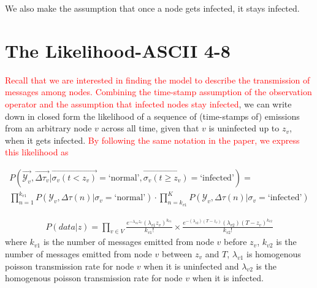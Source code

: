 \documentclass{article}
\begin{document}
	We also make the assumption that once a node gets infected, it
	stays infected.

\section{The Likelihood-ASCII 4-8}
	\textcolor{red}{Recall that we are interested in finding the model to describe
	the transmission of messages among nodes.
	Combining the time-stamp assumption of the observation operator and the assumption
	that infected nodes stay infected}, we can write down in closed form the likelihood
        of a sequence of (time-stamps of) emissions from an arbitrary node $v$ across all time, given that 
	$v$ is uninfected up to $z_{v}$, when it gets infected. \textcolor{red}{By following
	the same notation in the paper, we express this likelihood as} 
        
	\begin{eqnarray*}
		P(\vec{\mathscr{Y}_{v}}, \vec{\Delta\tau_{v}} | \vec{\sigma_{v}(t < z_{v})} = 
			\text{`normal'}, \vec{\sigma_{v}(t \geq z_{v})} = \text{`infected'})
		= \\
		\prod_{n = 1}^{k_{v1}} P(\mathscr{Y}_{v}, \Delta \tau (n) | \sigma_{v} = \text{`normal'})
			\cdot  
			\prod_{n = k_{v1}}^{K} P(\mathscr{Y}_{v}, \Delta \tau (n) | \sigma_{v} = \text{`infected'})
	\end{eqnarray*}
	
        \begin{align}
        P(data | z) = \prod_{v\in V}\frac{e^{-\lambda_{v1}z_v}(\lambda_{v1}z_v)^{k_{v1}}}{k_{v1}!}\times 
        \frac{e^{-(\lambda_{v2})(T-z_v)}(\lambda_{v2})(T-z_v)^{k_{v2}}}{k_{v2}!}
        \end{align}
        where $k_{v1}$ is the number of messages emitted from node $v$ before $z_v$, $k_{v2}$ 
        is the number of messages emitted from node $v$ between $z_v$ and $T$, $\lambda_{v1}$ is 
        homogenous poisson transmission rate for node $v$ when it is uninfected and $\lambda_{v2}$ is the 
        homogenous poisson transmission rate for node $v$ when it is infected.  
\end{document}
